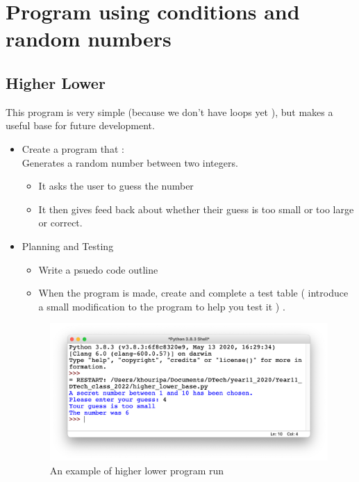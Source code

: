 \documentclass[a4paper,12pt]{article}
\begin{document}

\newpage
\section{Program using conditions and random numbers}
\subsection{Higher Lower}
This program is very simple (because we don't have loops yet ), but makes a useful base for future development.
\begin{itemize}
	\item Create a program that :\\
Generates a random number between two integers.
\begin{itemize}
	\item It asks the user to guess the number
	\item It then gives feed back about whether their guess is too small or too large or correct.
\end{itemize}
\item{Planning and Testing}
\begin{itemize}
	\item Write a psuedo code outline
	\item When the program is made, create and complete a test table ( introduce a small modification to the program to help you test it ) .
\end{itemize}

\begin{figure} [!h]
	\centering
	\includegraphics[width=13cm]{screen_shots/higher_lower_base.png}
	\caption*{An example of higher lower  program run}
\end{figure}

\end{itemize}
\newpage
\end{document}
